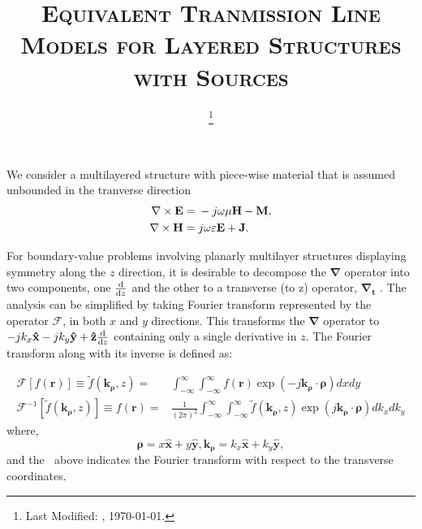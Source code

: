 \documentclass[11pt]{article}
\begin{document}
  \title{\textsc{Equivalent Tranmission Line Models for Layered Structures with Sources}\\}
  \date{\footnote{Last Modified: \currenttime, \today.}}
  \maketitle
  We consider a multilayered structure with piece-wise material that is assumed unbounded in the tranverse direction
  \begin{subequations}
    \begin{align}
      \nabla\times{\bf E} ={}& -j \omega \mu \bf{H} -\bf{M},
      \label{eq:E}\\
      \nabla\times{\bf H} ={}& j \omega \varepsilon \bf{E} + \bf{J}.
      \label{eq:H}
    \end{align}
    \label{eq:MaxE}
  \end{subequations}

  For boundary-value problems involving planarly multilayer structures displaying symmetry along the $z$ direction, it is desirable to decompose the $\mathbf{\nabla}$ operator into two components, one $\dv{}{z}$ and the other to a transverse (to z) operator, $\mathbf{\nabla_t}$ \cite[p. 64]{felsen1994radiation}. The analysis can be simplified by taking Fourier transform represented by the operator $\mathcal{F}$, in both $x$ and $y$ directions. This transforms the $\mathbf{\nabla}$ operator to $-j k_x \mathbf{\hat{x}} - j k_y \mathbf{\hat{y}} + \mathbf{\hat{z}}\dv{}{z}$ containing only a single derivative in $z$.
  The Fourier transform along with its inverse is defined as:

  \begin{subequations}
    \begin{align}
      \mathcal{F}[f(\mathbf{r})] \equiv \tilde{f}(\mathbf{k_{\rho}},z) ={}& \int_{-\infty}^{\infty} \int_{-\infty}^{\infty}
      f(\mathbf{r}) \exp(-j \mathbf{k_{\rho}} \cdot \mathbf{\rho}) dx dy
      \label{eq:Fourier}\\
      \mathcal{F}^{-1}[\tilde{f}(\mathbf{k_{\rho}},z)] \equiv f(\mathbf{r}) ={}& \frac{1}{(2\pi)^2} \int_{-\infty}^{\infty} \int_{-\infty}^{\infty} \tilde{f}(\mathbf{k_{\rho}},z)
      \exp(j \mathbf{k_{\rho}} \cdot \mathbf{\rho}) dk_x dk_y
      \label{eq:IFourier}
    \end{align}
    \label{eq:FT}
  \end{subequations}
  where,
  \begin{equation}
    \mathbf{\rho} = x\mathbf{\hat{x}} + y\mathbf{\hat{y}},
    \mathbf{k_{\rho}} = k_x\mathbf{\hat{x}} + k_y\mathbf{\hat{y}},
  \end{equation}
  and the $~$ above indicates the Fourier transform with respect to the transverse coordinates.
\end{document}
